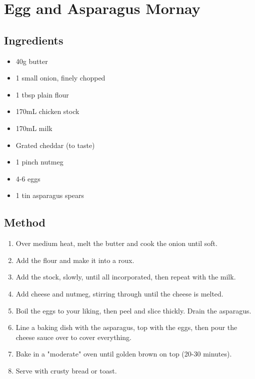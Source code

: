 \section{Egg and Asparagus Mornay}

\subsection{Ingredients}

\begin{itemize}
	\item 40g butter
	\item 1 small onion, finely chopped
	\item 1 tbsp plain flour
	\item 170mL chicken stock
	\item 170mL milk
	\item Grated cheddar (to taste)
	\item 1 pinch nutmeg
	\item 4-6 eggs
	\item 1 tin asparagus spears
\end{itemize}

\subsection{Method}

\begin{enumerate}
	\item Over medium heat, melt the butter and cook the onion until soft.
	\item Add the flour and make it into a roux.
	\item Add the stock, slowly, until all incorporated, then repeat with the milk.
	\item Add cheese and nutmeg, stirring through until the cheese is melted.
	\item Boil the eggs to your liking, then peel and slice thickly. Drain the asparagus.
	\item Line a baking dish with the asparagus, top with the eggs, then pour the cheese sauce over to cover everything.
	\item Bake in a "moderate" oven until golden brown on top (20-30 minutes).
	\item Serve with crusty bread or toast.
\end{enumerate}
